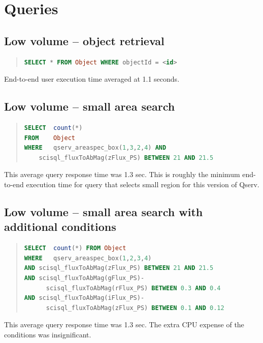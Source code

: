 \documentclass[DM,toc]{lsstdoc}
\begin{document}
\section{Queries}

\subsection{Low volume – object retrieval}

\begin{quote}
\begin{lstlisting}[language=SQL]
SELECT * FROM Object WHERE objectId = <id>
\end{lstlisting}
\end{quote}

End-to-end user execution time averaged at 1.1 seconds.

\subsection{Low volume – small area search}

\begin{quote}
\begin{lstlisting}[language=SQL]
SELECT	count(*)
FROM	Object
WHERE	qserv_areaspec_box(1,3,2,4) AND
	scisql_fluxToAbMag(zFlux_PS) BETWEEN 21 AND 21.5
\end{lstlisting}
\end{quote}

This average query response time was 1.3 sec. This is roughly the minimum end-to-end execution time for query that selects small region for this version of Qserv.

\subsection{Low volume – small area search with additional conditions}

\begin{quote}
\begin{lstlisting}[language=SQL]
SELECT	count(*) FROM Object
WHERE	qserv_areaspec_box(1,2,3,4)
AND	scisql_fluxToAbMag(zFlux_PS) BETWEEN 21 AND 21.5
AND	scisql_fluxToAbMag(gFlux_PS)-
	  scisql_fluxToAbMag(rFlux_PS) BETWEEN 0.3 AND 0.4
AND	scisql_fluxToAbMag(iFlux_PS)-
	  scisql_fluxToAbMag(zFlux_PS) BETWEEN 0.1 AND 0.12
\end{lstlisting}
\end{quote}

This average query response time was 1.3 sec. The extra CPU expense of the conditions was insignificant.
\end{document}
